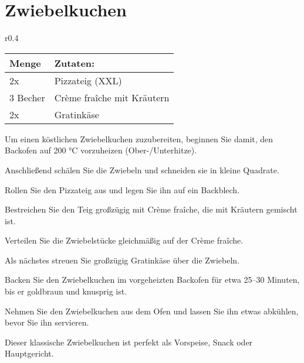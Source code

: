\section{Zwiebelkuchen}
\begin{wraptable}{r}{0.4\textwidth}
  \centering
  \begin{tabularx}{0.39\textwidth}{|l|X|}
    \toprule
    Menge & Zutaten: \\
    \midrule
    2x & Pizzateig (XXL) \\
    \midrule
    3 Becher & Crème fraîche mit Kräutern \\
    \midrule
    2x & Gratinkäse\\
    \bottomrule
  \end{tabularx}
\end{wraptable}
Um einen köstlichen Zwiebelkuchen zuzubereiten, beginnen Sie damit, den Backofen auf 200 °C vorzuheizen (Ober-/Unterhitze).

Anschließend schälen Sie die Zwiebeln und schneiden sie in kleine Quadrate.

Rollen Sie den Pizzateig aus und legen Sie ihn auf ein Backblech.

Bestreichen Sie den Teig großzügig mit Crème fraîche, die mit Kräutern gemischt ist.

Verteilen Sie die Zwiebelstücke gleichmäßig auf der Crème fraîche.

Als nächstes streuen Sie großzügig Gratinkäse über die Zwiebeln.

Backen Sie den Zwiebelkuchen im vorgeheizten Backofen für etwa 25–30 Minuten, bis er goldbraun und knusprig ist.

Nehmen Sie den Zwiebelkuchen aus dem Ofen und lassen Sie ihn etwas abkühlen, bevor Sie ihn servieren.

Dieser klassische Zwiebelkuchen ist perfekt als Vorspeise, Snack oder Hauptgericht.
\newpage
